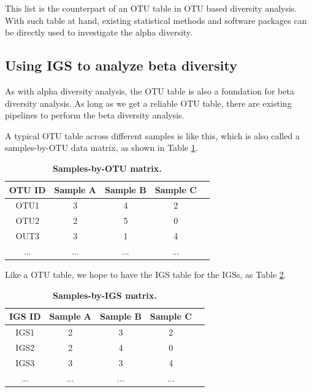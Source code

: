 \documentclass{article}
\begin{document}
This list is the counterpart of an 
OTU table in OTU based diversity analysis.
With such table at hand, existing statistical methods and software 
packages can be directly used to investigate the alpha diversity.  

\subsection{Using IGS to analyze beta diversity}

As with alpha diversity analysis, the OTU table is also a foundation for beta 
diversity analysis. As long as we get a reliable OTU table, there are existing 
pipelines to perform the beta diversity analysis. 

A typical OTU table across different samples is like this, which is also 
called a samples-by-OTU data matrix, as shown in Table \ref{table:OTU_table}.

\begin{table}[!ht]
\centering
\begin{tabular}{ |c | c |c| c|c| }
\hline 
    OTU ID & Sample A & Sample B & Sample C \\
\hline 
OTU1 & 3 & 4 & 2  \\
OTU2 & 2 & 5 & 0 \\
OUT3 & 3 & 1 & 4 \\
...  & ... & ... & ... \\
\hline 
\end{tabular}
\begin{flushleft}
\end{flushleft}
\caption{\bf Samples-by-OTU matrix.}
\label{table:OTU_table}
\end{table}

Like a OTU table, we hope to have the IGS table for the IGSs, as Table \ref{table:IGS_table}.

\begin{table}[!ht]
\centering
\begin{tabular}{ |c | c |c| c|c| }
\hline 
    IGS ID & Sample A & Sample B & Sample C \\
\hline 
IGS1 & 2 & 3 & 2  \\
IGS2 & 2 & 4 & 0 \\
IGS3 & 3 & 3 & 4 \\
...  & ... & ... & ... \\
\hline 
\end{tabular}
\caption{\bf Samples-by-IGS matrix.}
\label{table:IGS_table}
\end{table}
\end{document}
